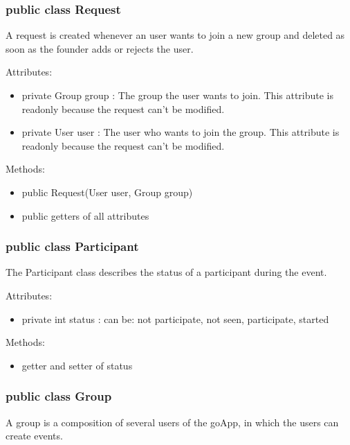 	\subsubsection{public class Request}
	A request is created whenever an user wants to join a new group and deleted as soon as the founder adds or rejects the user.
	
	Attributes:
	\begin{itemize}
	\item private Group group : The group the user wants to join. This attribute is readonly because the request can't be modified.
	\item private User user : The user who wants to join the group. This attribute is readonly because the request can't be modified.
	\end{itemize}
	
	Methods: 
	\begin{itemize}
	\item public Request(User user, Group group)
	\item public getters of all attributes
	\end{itemize}
	


\subsubsection {public class Participant} 
 The Participant class describes the status of a participant during the event.

Attributes:
\begin{itemize}
\item	private int status : can be: not participate, not seen, participate, started
\end{itemize}

	Methods: 
	\begin{itemize}
	\item getter and setter of status
	\end{itemize}

	
	\subsubsection{public class Group}
	A group is a composition of several users of the goApp, in which the users can create events.

